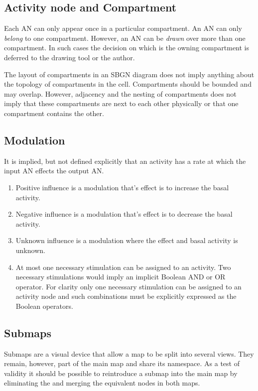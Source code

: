 \subsection{Activity node and Compartment}

Each AN can only appear once in a particular compartment.  An AN can only \emph{belong} to one compartment. However, an AN can be \emph{drawn} over more than one compartment. In such cases the decision on which is the owning compartment is deferred to the drawing tool or the author. 

The layout of compartments in an SBGN diagram does not imply anything about the topology of compartments in the cell. Compartments should be bounded and may overlap. However, adjacency and the nesting of compartments does not imply that these compartments are next to each other physically or that one compartment contains the other.

\subsection{Modulation}

It is implied, but not defined explicitly that an activity has a rate at which the input AN effects the output AN. 

\begin{enumerate}
\item Positive influence is a modulation that's effect is to increase the basal activity.
\item Negative influence is a modulation that's effect is to decrease the basal activity.
\item Unknown influence is a modulation where the effect and basal activity is unknown.
\item At most one necessary stimulation can be assigned to an activity. Two necessary stimulations
  would imply an implicit Boolean AND or OR operator. For clarity only
  one necessary stimulation can be assigned to an activity node and such combinations must be
  explicitly expressed as the Boolean operators.
\end{enumerate}

\subsection{Submaps}

Submaps are a visual device that allow a map to be split into several views. They remain, however, part of the main map and share its namespace. As a test of validity it should be possible to reintroduce a submap into the main map by eliminating the  and merging
the equivalent nodes in both maps.

